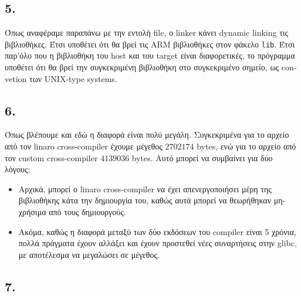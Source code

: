 \documentclass{article}
\newcommand{\english}[1]{\foreignlanguage{english}{{#1}}}
\begin{document}
\subsection*{5.}
Όπως αναφέραμε παραπάνω με την εντολή \english{file}, ο \english{linker} κάνει \english{dynamic linking} τις βιβλιοθήκες. Έτσι υποθέτει ότι θα βρεί τις \english{ARM} βιβλιοθήκες στον φάκελο \english{\texttt{lib}}. Έτσι παρ'όλο που η βιβλιοθήκη του \english{host} και του \english{target} είναι διαφορετικές, το πρόγραμμα υποθέτει ότι θα βρεί την συγκεκριμένη βιβλιοθήκη στο συγκεκριμένο σημείο, ως \english{convetion} των \english{UNIX-type systems}.

\subsection*{6.}
Όπως βλέπουμε και εδώ η διαφορά είναι πολύ μεγάλη. Συγκεκριμένα για το αρχείο από τον \english{linaro cross-compiler} έχουμε μέγεθος $2702174$ \english{bytes}, ενώ για το αρχείο από τον \english{custom cross-compiler} $4139036$ \english{bytes}. Αυτό μπορεί να συμβαίνει για δύο λόγους:
\begin{itemize}
    \item Αρχικά, μπορεί ο \english{linaro cross-compiler} να έχει απενεργοποιήσει μέρη της βιβλιοθήκης κάτα την δημιουργία του, καθώς αυτά μπορεί να θεωρήθηκαν μη-χρήσιμα από τους δημιουργούς.
    \item Ακόμα, καθώς η διαφορά μεταξύ των δύο εκδόσεων του \english{compiler} είναι 5 χρόνια, πολλά πράγματα έχουν αλλάξει και έχουν προστεθεί νέες συναρτήσεις στην \english{glibc}, με αποτέλεσμα να μεγαλώσει σε μέγεθος. 
\end{itemize}
\subsection*{7.}
\end{document}
